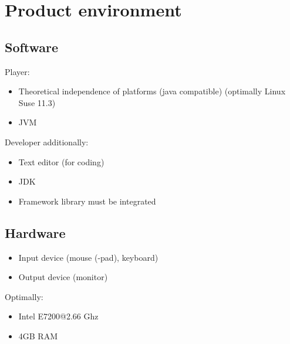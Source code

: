 \section{Product environment}

\subsection{Software}
Player:
\begin{itemize}
\item Theoretical independence of platforms (\Gls{java} compatible) (optimally Linux Suse 11.3)
\item \Gls{JVM}
\end{itemize}
Developer additionally:
\begin{itemize}
\item Text editor (for coding)
\item \Gls{JDK}
\item Framework library must be integrated
\end{itemize}

\subsection{Hardware}
\begin{itemize}
\item Input device (mouse (-pad), keyboard)
\item Output device (monitor)
\end{itemize}
Optimally:
\begin{itemize}
\item Intel E7200@2.66 Ghz
\item 4GB RAM
\end{itemize}